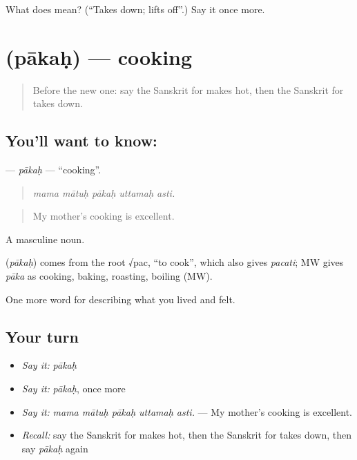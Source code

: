 \begin{tcolorbox}[breakable,colback=teal!4,colframe=teal!35!black,title={Before you move on}]
What does  mean? (\textquotedblleft{}Takes down; lifts off\textquotedblright{}.) Say it once more.
\end{tcolorbox}
\section[\texorpdfstring{\sk{पाकः} (pākaḥ)}{पाकः (pākaḥ)}]{ (pākaḥ) — cooking}

\label{lesson:SA-C511-pakah}



\begin{quote}
Before the new one: say the Sanskrit for makes hot, then the Sanskrit for takes down.
\end{quote}

\subsection*{You'll want to know: }
\textbf{} — \emph{pākaḥ} — \textquotedblleft{}cooking\textquotedblright{}.

\begin{quote}
    
\end{quote}

\begin{quote}
\emph{mama mātuḥ pākaḥ uttamaḥ asti.}
\end{quote}

\begin{quote}
My mother's cooking is excellent.
\end{quote}

A masculine noun.

\begin{cousinweb}
\textbf{} (\emph{pākaḥ}) comes from the root √pac, \textquotedblleft{}to cook\textquotedblright{}, which also gives \emph{pacati}; MW gives \emph{pāka} as cooking, baking, roasting, boiling (MW).
\end{cousinweb}

\begin{grammarlens}[title={What you've built}]
One more word for describing what you lived and felt.
\end{grammarlens}

\subsection*{Your turn}
\begin{itemize}
\raggedright
  \item \emph{Say it:} \emph{pākaḥ}
  \item \emph{Say it:} \emph{pākaḥ}, once more
  \item \emph{Say it:} \emph{mama mātuḥ pākaḥ uttamaḥ asti.} — My mother's cooking is excellent.
  \item \emph{Recall:} say the Sanskrit for makes hot, then the Sanskrit for takes down, then say \emph{pākaḥ} again
\end{itemize}

